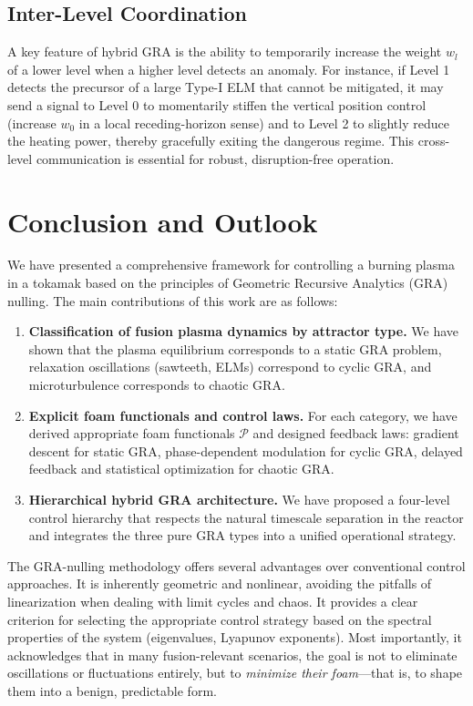 \documentclass[12pt,a4paper]{article}
\begin{document}
\subsection{Inter-Level Coordination}

A key feature of hybrid GRA is the ability to temporarily increase the weight $w_l$ of a lower level when a higher level detects an anomaly. For instance, if Level 1 detects the precursor of a large Type-I ELM that cannot be mitigated, it may send a signal to Level 0 to momentarily stiffen the vertical position control (increase $w_0$ in a local receding-horizon sense) and to Level 2 to slightly reduce the heating power, thereby gracefully exiting the dangerous regime. This cross-level communication is essential for robust, disruption-free operation.

\section{Conclusion and Outlook}
\label{sec:conclusion}

We have presented a comprehensive framework for controlling a burning plasma in a tokamak based on the principles of Geometric Recursive Analytics (GRA) nulling. The main contributions of this work are as follows:

\begin{enumerate}
    \item \textbf{Classification of fusion plasma dynamics by attractor type.} We have shown that the plasma equilibrium corresponds to a static GRA problem, relaxation oscillations (sawteeth, ELMs) correspond to cyclic GRA, and microturbulence corresponds to chaotic GRA.
    \item \textbf{Explicit foam functionals and control laws.} For each category, we have derived appropriate foam functionals $\mathcal{P}$ and designed feedback laws: gradient descent for static GRA, phase-dependent modulation for cyclic GRA, delayed feedback and statistical optimization for chaotic GRA.
    \item \textbf{Hierarchical hybrid GRA architecture.} We have proposed a four-level control hierarchy that respects the natural timescale separation in the reactor and integrates the three pure GRA types into a unified operational strategy.
\end{enumerate}

The GRA-nulling methodology offers several advantages over conventional control approaches. It is inherently geometric and nonlinear, avoiding the pitfalls of linearization when dealing with limit cycles and chaos. It provides a clear criterion for selecting the appropriate control strategy based on the spectral properties of the system (eigenvalues, Lyapunov exponents). Most importantly, it acknowledges that in many fusion-relevant scenarios, the goal is not to eliminate oscillations or fluctuations entirely, but to \textit{minimize their foam}—that is, to shape them into a benign, predictable form.
\end{document}
